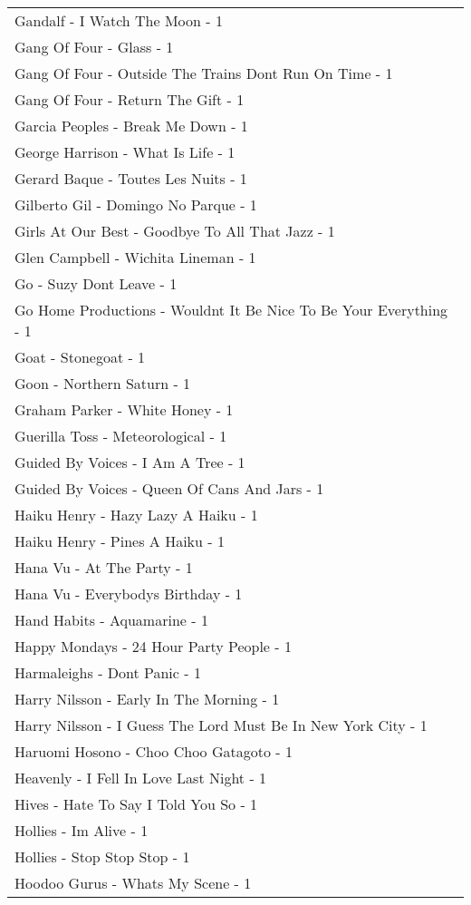 \documentclass[
]{article}
\begin{document}
\begin{longtable}{l}
Gandalf - I Watch The Moon - 1 \\ 
Gang Of Four - Glass - 1 \\ 
Gang Of Four - Outside The Trains Dont Run On Time - 1 \\ 
Gang Of Four - Return The Gift - 1 \\ 
Garcia Peoples - Break Me Down - 1 \\ 
George Harrison - What Is Life - 1 \\ 
Gerard Baque - Toutes Les Nuits - 1 \\ 
Gilberto Gil - Domingo No Parque - 1 \\ 
Girls At Our Best - Goodbye To All That Jazz - 1 \\ 
Glen Campbell - Wichita Lineman - 1 \\ 
Go - Suzy Dont Leave - 1 \\ 
Go Home Productions - Wouldnt It Be Nice To Be Your Everything - 1 \\ 
Goat - Stonegoat - 1 \\ 
Goon - Northern Saturn - 1 \\ 
Graham Parker - White Honey - 1 \\ 
Guerilla Toss - Meteorological - 1 \\ 
Guided By Voices - I Am A Tree - 1 \\ 
Guided By Voices - Queen Of Cans And Jars - 1 \\ 
Haiku Henry - Hazy Lazy A Haiku - 1 \\ 
Haiku Henry - Pines A Haiku - 1 \\ 
Hana Vu - At The Party - 1 \\ 
Hana Vu - Everybodys Birthday - 1 \\ 
Hand Habits - Aquamarine - 1 \\ 
Happy Mondays - 24 Hour Party People - 1 \\ 
Harmaleighs - Dont Panic - 1 \\ 
Harry Nilsson - Early In The Morning - 1 \\ 
Harry Nilsson - I Guess The Lord Must Be In New York City - 1 \\ 
Haruomi Hosono - Choo Choo Gatagoto - 1 \\ 
Heavenly - I Fell In Love Last Night - 1 \\ 
Hives - Hate To Say I Told You So - 1 \\ 
Hollies - Im Alive - 1 \\ 
Hollies - Stop Stop Stop - 1 \\ 
Hoodoo Gurus - Whats My Scene - 1 \\ 

\end{longtable}
\end{document}
